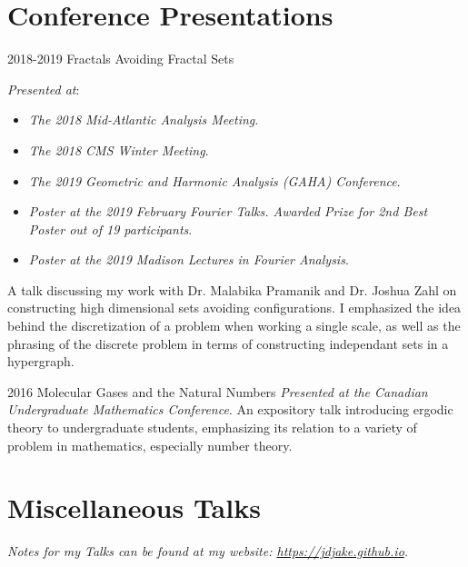 \documentclass[a4paper]{cv-friggeri}
\begin{document}

\newpage


\section{Conference Presentations}

\begin{entrylist}

\entry
{2018-2019}
{Fractals Avoiding Fractal Sets}
{}
{\emph{Presented at}:
%
\begin{itemize}
	\item \emph{The 2018 Mid-Atlantic Analysis Meeting}.
	\item \emph{The 2018 CMS Winter Meeting}.
	\item \emph{The 2019 Geometric and Harmonic Analysis (GAHA) Conference}.
	\item \emph{Poster at the 2019 February Fourier Talks. Awarded Prize for 2nd Best Poster out of 19 participants}.
	\item \emph{Poster at the 2019 Madison Lectures in Fourier Analysis}.
\end{itemize}
%
A talk discussing my work with Dr. Malabika Pramanik and Dr. Joshua Zahl on constructing high dimensional sets avoiding configurations. I emphasized the idea behind the discretization of a problem when working a single scale, as well as the phrasing of the discrete problem in terms of constructing independant sets in a hypergraph.}

\entry
{2016}
{Molecular Gases and the Natural Numbers}
{}
{\emph{Presented at the Canadian Undergraduate Mathematics Conference}. An expository talk introducing ergodic theory to undergraduate students, emphasizing its relation to a variety of problem in mathematics, especially number theory.}

\end{entrylist}

\section{Miscellaneous Talks}

\emph{Notes for my Talks can be found at my website: \href{https://jdjake.github.io}{https://jdjake.github.io}.}
\end{document}
